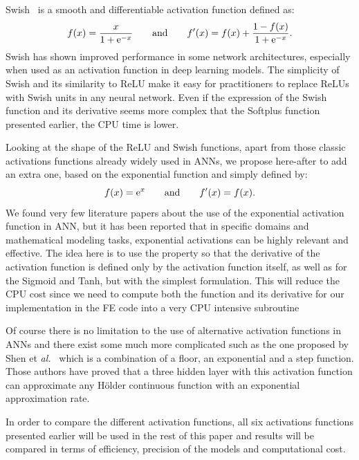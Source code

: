 \documentclass[algorithms,article,submit,pdftex,oneauthors]{Definitions/mdpi}
\makeatletter
\DeclareRobustCommand{\e}[1]{{\rm e}^{#1}}
\DeclareRobustCommand{\eal}{et \emph{al.}\@\xspace}
\makeatother
\begin{document}
Swish~\cite{Ramachandran-2018-SAF} is a smooth and differentiable activation function defined as:
\begin{equation}
f(x) = \frac{x}{1+\e{-x}}\qquad \text{and}\qquad f'(x) = f(x) + \frac{1 - f(x)}{1+\e{-x}}.\label{eq:act-swish}
\end{equation}
Swish has shown improved performance in some network architectures, especially when used as an activation function in deep learning models.
The simplicity of Swish and its similarity to ReLU make it easy for practitioners to replace ReLUs with Swish units in any neural network.
Even if the expression of the Swish function and its derivative seems more complex that the Softplus function presented earlier, the CPU time is lower.

Looking at the shape of the ReLU and Swish functions, apart from those classic activations functions already widely used in ANNs, we propose here-after to add an extra one, based on the exponential function and simply defined by:
\begin{equation}
f(x) = \e{x}\qquad \text{and}\qquad f'(x) = f(x).\label{eq:act-exp}
\end{equation}
We found very few literature papers about the use of the exponential activation function in ANN, but it has been reported that in specific domains and mathematical modeling tasks, exponential activations can be highly relevant and effective.
The idea here is to use the property so that the derivative of the activation function is defined only by the activation function itself, as well as for the Sigmoid and Tanh, but with the simplest formulation.
This will reduce the CPU cost since we need to compute both the function and its derivative for our implementation in the FE code into a very CPU intensive subroutine

Of course there is no limitation to the use of alternative activation functions in ANNs and there exist some much more complicated such as the one proposed by Shen \eal~\cite{Shen-2021-NNA} which is a combination of a floor, an exponential and a step function.
Those authors have proved that a three hidden layer with this activation function can approximate any Hölder continuous function with an exponential approximation rate.

In order to compare the different activation functions, all six activations functions presented earlier will be used in the rest of this paper and results will be compared in terms of efficiency,  precision of the models and computational cost.
\end{document}
